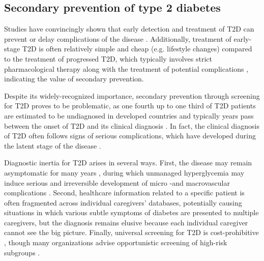 \subsection{Secondary prevention of type 2 diabetes} \label{intro:screening}
Studies have convincingly shown that early detection and treatment of T2D can prevent or delay complications of the disease \citep{haffner1990cardiovascular,engelgau2000screening, genuth2003implications, holman200810, gaede2008effect, echouffo2011screening}. Additionally, treatment of early-stage T2D is often relatively simple and cheap (e.g. lifestyle changes) compared to the treatment of progressed T2D, which typically involves strict pharmacological therapy along with the treatment of potential complications \citep{pan1997effects,tuomilehto2001prevention,diabetes2002reduction,zammitt2005hypoglycemia}, indicating the value of secondary prevention.

Despite its widely-recognized importance, secondary prevention through screening for T2D proves to be problematic, as one fourth up to one third of T2D patients are estimated to be undiagnosed in developed countries \citep{diabetesliga, beagley2014global, american2014standards} and typically years pass between the onset of T2D and its clinical diagnosis \citep{harris1992onset}. In fact, the clinical diagnosis of T2D often follows signs of serious complications, which have developed during the latent stage of the disease \citep{rajala1998prevalence,harris2000early, hu2002elevated, american2014standards}. 

Diagnostic inertia for T2D arises in several ways. First, the disease may remain asymptomatic for many years \citep{alberti1998report}, during which unmanaged hyperglycemia may induce serious and irreversible development of micro -and macrovascular complications \citep{fowler2008microvascular, beagley2014global}. Second, healthcare information related to a specific patient is often fragmented across individual caregivers' databases, potentially causing situations in which various subtle symptoms of diabetes are presented to multiple caregivers, but the diagnosis remains elusive because each individual caregiver cannot see the big picture. Finally, universal screening for T2D is cost-prohibitive \citep{wareham2001should, engelgau2000screening}, though many organizations advise opportunistic screening of high-risk subgroups \citep{world1994prevention, alberti1998report, engelgau2000screening,american2014standards}.

